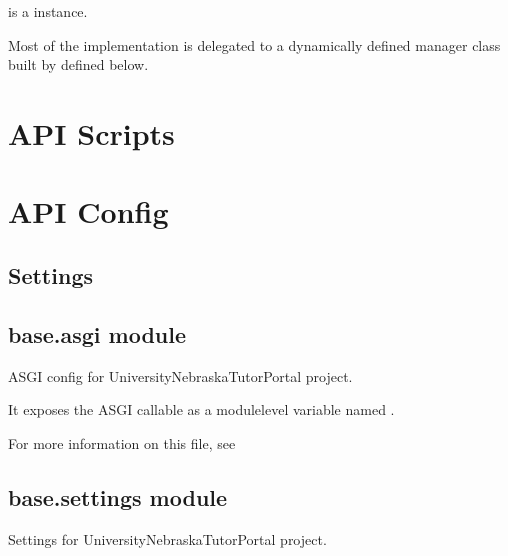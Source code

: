 \documentclass[letterpaper,10pt,english]{sphinxmanual}
\begin{document}
\begin{fulllineitems}
\begin{fulllineitems}
\sphinxAtStartPar
{} is a  instance.

\sphinxAtStartPar
Most of the implementation is delegated to a dynamically defined manager
class built by  defined below.

\end{fulllineitems}


\end{fulllineitems}


\sphinxstepscope


\chapter{API Scripts}
\label{\detokenize{scripts/index:api-scripts}}\label{\detokenize{scripts/index::doc}}
\sphinxstepscope


\chapter{API Config}
\label{\detokenize{settings/index:api-config}}\label{\detokenize{settings/index::doc}}
\sphinxstepscope


\section{Settings}
\label{\detokenize{settings/settings:settings}}\label{\detokenize{settings/settings::doc}}

\section{base.asgi module}
\label{\detokenize{settings/settings:module-base.asgi}}\label{\detokenize{settings/settings:base-asgi-module}}
\sphinxAtStartPar
ASGI config for University\sphinxhyphen{}Nebraska\sphinxhyphen{}Tutor\sphinxhyphen{}Portal project.

\sphinxAtStartPar
It exposes the ASGI callable as a module\sphinxhyphen{}level variable named .

\sphinxAtStartPar
For more information on this file, see


\section{base.settings module}
\label{\detokenize{settings/settings:module-base.settings}}\label{\detokenize{settings/settings:base-settings-module}}
\sphinxAtStartPar
Settings for University\sphinxhyphen{}Nebraska\sphinxhyphen{}Tutor\sphinxhyphen{}Portal project.
\end{document}
